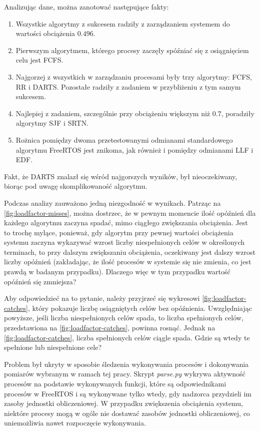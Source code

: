 \documentclass[../../main]{subfiles}
\begin{document}
Analizując dane, można zanotować następujące fakty:

\begin{enumerate}
    \item Wszystkie algorytmy z sukcesem radziły z zarządzaniem systemem do wartości obciążenia $0.496$.
    \item Pierwszym algorytmem, którego procesy zaczęły spóźniać się z osiągnięciem celu jest FCFS.
    \item Najgorzej z wszystkich w zarządzaniu procesami były trzy algorytmy: FCFS, RR i DARTS. Pozostałe radziły z zadaniem w przybliżeniu z tym samym sukcesem.
    \item Najlepiej z zadaniem, szczególnie przy obciążeniu większym niż $0.7$, poradziły algorytmy SJF i SRTN.
    \item Rożnica pomiędzy dwoma przetestowanymi odmianami standardowego algorytmu FreeRTOS jest znikoma, jak również i pomiędzy odmianami LLF i EDF.
\end{enumerate}

Fakt, że DARTS znalazł się wśród najgorszych wyników, był nieoczekiwany, biorąc pod uwagę skomplikowaność algorytmu.

Podczas analizy zauważono jedną niezgodność w wynikach. Patrząc na \cref{fig:loadfactor-misses}, można dostrzec, że w pewnym momencie ilość opóźnień dla każdego algorytmu zaczyna spadać, mimo ciągłego zwiększania obciążenia. Jest to trochę mylące, ponieważ, gdy algorytm przy pewnej wartości obciążenia systemu zaczyna wykazywać wzrost liczby niespełnionych celów w określonych terminach, to przy dalszym zwiększaniu obciążenia, oczekiwany jest dalszy wzrost liczby opóźnień (zakładając, że ilość procesów w systemie się nie zmienia, co jest prawdą w badanym przypadku). Dlaczego więc w tym przypadku wartość opóźnień się zmniejsza?

Aby odpowiedzieć na to pytanie, należy przyjrzeć się wykresowi \cref{fig:loadfactor-catches}, który pokazuje liczbę osiągniętych celów bez opóźnienia. Uwzględniając powyższe, jeśli liczba niespełnionych celów spada, to liczba spełnionych celów, przedstawiona na \cref{fig:loadfactor-catches}, powinna rosnąć. Jednak na \cref{fig:loadfactor-catches}, liczba spełnionych celów ciągle spada. Gdzie są wtedy te spełnione lub niespełnione cele?

Problem był ukryty w sposobie śledzenia wykonywania procesów i dokonywania pomiarów wybranym w ramach tej pracy. Skrypt \textit{parse.py} wykrywa aktywność procesów na podstawie wykonywanych funkcji, które są odpowiednikami procesów w FreeRTOS i są wykonywane tylko wtedy, gdy nadzorca przydzieli im zasoby jednostki obliczeniowej. W przypadku zwiększenia obciążenia systemu, niektóre procesy mogą w ogóle nie dostawać zasobów jednostki obliczeniowej, co uniemożliwia nawet rozpoczęcie wykonywania.
\end{document}
